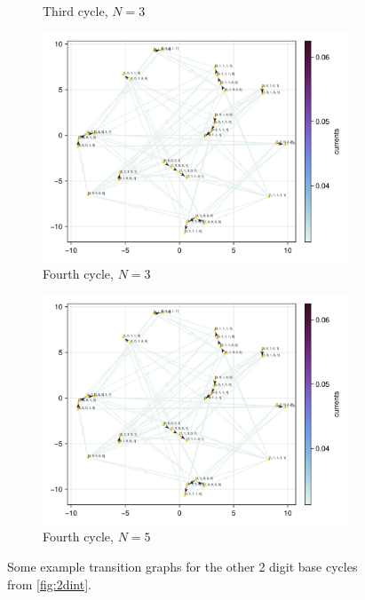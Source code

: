 \documentclass[11pt]{article}
\theoremstyle{nothm}
\begin{document}
\begin{figure}[H]
\begin{subfigure}[t]{0.49\textwidth}
        \caption{Third cycle, $N=3$}
    \end{subfigure}
    \begin{subfigure}[t]{0.49\textwidth}
        \includegraphics[width=\textwidth]{../../plots/ones/c4/spring_N=5_metadata=(chash=2008083833646787391,ctype=simple).png}
        \centering
        \caption{Fourth cycle, $N=3$}
    \end{subfigure}
    \begin{subfigure}[t]{0.49\textwidth}
        \centering
        \includegraphics[width=\textwidth]{../../plots/ones/c4/spring_N=5_metadata=(chash=2008083833646787391,ctype=simple).png}
        \caption{Fourth cycle, $N=5$}
    \end{subfigure}
    \caption{
        Some example transition graphs for the other 2 digit base cycles from \cref{fig:2dint}.
    }\label{fig:2dothers}
\end{figure}
\end{document}
